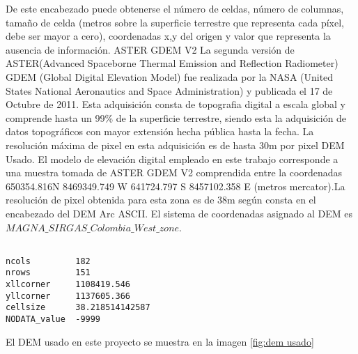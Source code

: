 De este encabezado puede obtenerse el n\'{u}mero de celdas, n\'{u}mero de columnas, tama\~{n}o de celda (metros
sobre la superficie terrestre que representa cada p\'{i}xel, debe ser mayor a cero),
coordenadas x,y del origen y valor que representa la ausencia de informaci\'{o}n.
ASTER GDEM V2
La segunda versi\'{o}n de ASTER(Advanced Spaceborne Thermal Emission and Reflection
Radiometer) GDEM (Global Digital Elevation Model) fue realizada por la NASA (United
States National Aeronautics and Space Administration) y publicada el 17 de Octubre de
2011. Esta adquisici\'{o}n consta de topografia digital a escala global y comprende hasta un
99\% de la superficie terrestre, siendo esta la adquisici\'{o}n de datos topogr\'{a}ficos con mayor
extensi\'{o}n hecha p\'{u}blica hasta la fecha.
La resoluci\'{o}n m\'{a}xima de pixel en esta adquisici\'{o}n es de hasta 30m por pixel
DEM Usado.
El modelo de elevaci\'{o}n digital empleado en este trabajo corresponde a una muestra tomada
de ASTER GDEM V2 comprendida entre la coordenadas 650354.816N 8469349.749 W
641724.797 S 8457102.358 E (metros mercator).La resoluci\'{o}n de pixel obtenida para esta
zona es de 38m seg\'{u}n consta en el encabezado del DEM Arc ASCII. El sistema de
coordenadas asignado al DEM es $ MAGNA\_SIRGAS\_Colombia\_West\_zone$.\par

\begin{lstlisting}

ncols         182
nrows         151
xllcorner     1108419.546
yllcorner     1137605.366
cellsize      38.218514142587
NODATA_value  -9999
\end{lstlisting}

El DEM usado en este proyecto se muestra en la imagen \ref{fig:dem usado}